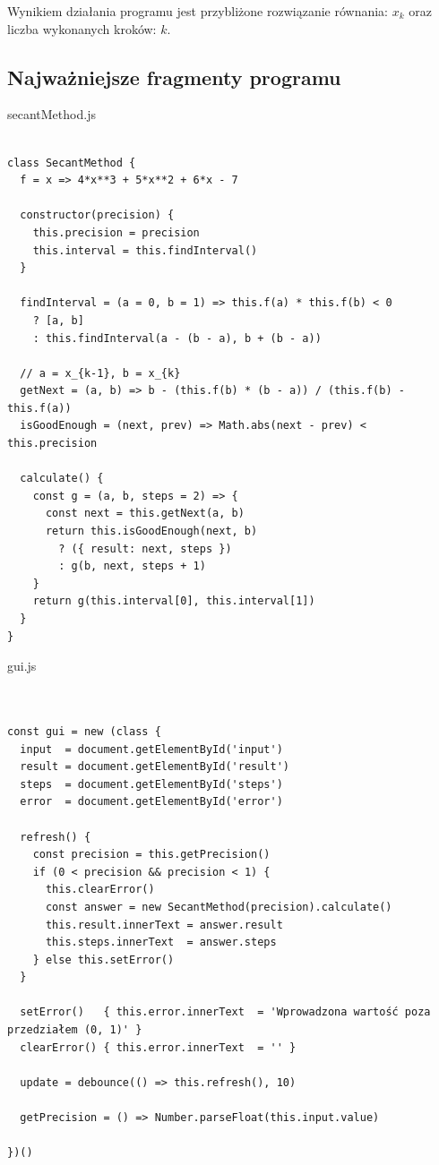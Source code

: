 \documentclass[12pt]{article}
\begin{document}
Wynikiem działania programu jest przybliżone rozwiązanie równania: $x_k$ oraz liczba wykonanych kroków: $k$.
\newpage
\subsection{Najważniejsze fragmenty programu}
secantMethod.js
\begin{verbatim}

class SecantMethod {
  f = x => 4*x**3 + 5*x**2 + 6*x - 7

  constructor(precision) {
    this.precision = precision
    this.interval = this.findInterval()
  }

  findInterval = (a = 0, b = 1) => this.f(a) * this.f(b) < 0
    ? [a, b]
    : this.findInterval(a - (b - a), b + (b - a))

  // a = x_{k-1}, b = x_{k}
  getNext = (a, b) => b - (this.f(b) * (b - a)) / (this.f(b) - this.f(a))
  isGoodEnough = (next, prev) => Math.abs(next - prev) < this.precision

  calculate() {
    const g = (a, b, steps = 2) => {
      const next = this.getNext(a, b)
      return this.isGoodEnough(next, b)
        ? ({ result: next, steps })
        : g(b, next, steps + 1)
    }
    return g(this.interval[0], this.interval[1])
  }
}

\end{verbatim}
\newpage
gui.js
\begin{verbatim}


const gui = new (class {
  input  = document.getElementById('input')
  result = document.getElementById('result')
  steps  = document.getElementById('steps')
  error  = document.getElementById('error')

  refresh() {
    const precision = this.getPrecision()
    if (0 < precision && precision < 1) {
      this.clearError()
      const answer = new SecantMethod(precision).calculate()
      this.result.innerText = answer.result
      this.steps.innerText  = answer.steps
    } else this.setError()
  }

  setError()   { this.error.innerText  = 'Wprowadzona wartość poza przedziałem (0, 1)' }
  clearError() { this.error.innerText  = '' }

  update = debounce(() => this.refresh(), 10)

  getPrecision = () => Number.parseFloat(this.input.value)

})()
\end{verbatim}
\newpage
\end{document}
